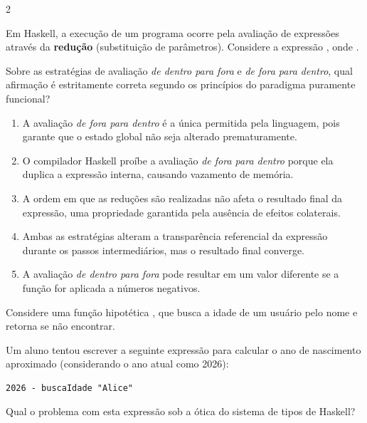 \documentclass[a4paper,10pt,brazil]{article}
\begin{document}
\begin{multicols}{2}
\begin{enumerate}
\end{enumerate}

Em Haskell, a execução de um programa ocorre pela avaliação de expressões através da \textbf{redução} (substituição de parâmetros). Considere a expressão , onde . 

Sobre as estratégias de avaliação \emph{de dentro para fora} e \emph{de fora para dentro}, qual afirmação é estritamente correta segundo os princípios do paradigma puramente funcional?

\begin{enumerate}
  \item A avaliação \emph{de fora para dentro} é a única permitida pela linguagem, pois garante que o estado global não seja alterado prematuramente.

  \item O compilador Haskell proíbe a avaliação \emph{de fora para dentro} porque ela duplica a expressão interna, causando vazamento de memória.

  \item A ordem em que as reduções são realizadas não afeta o resultado final da expressão, uma propriedade garantida pela ausência de efeitos colaterais.

  \item Ambas as estratégias alteram a transparência referencial da expressão durante os passos intermediários, mas o resultado final converge.

  \item A avaliação \emph{de dentro para fora} pode resultar em um valor diferente se a função  for aplicada a números negativos.


\end{enumerate}

Considere uma função hipotética , que busca a idade de um usuário pelo nome e retorna  se não encontrar. 

Um aluno tentou escrever a seguinte expressão para calcular o ano de nascimento aproximado (considerando o ano atual como 2026):
\begin{verbatim}
2026 - buscaIdade "Alice"
\end{verbatim}

Qual o problema com esta expressão sob a ótica do sistema de tipos de Haskell?


\end{multicols}
\end{document}
